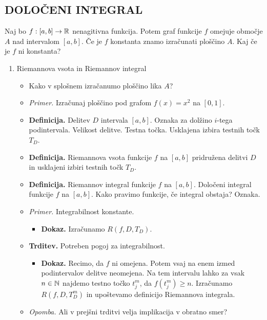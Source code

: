 \subsection{DOLOČENI INTEGRAL}
Naj bo $f: [a, b] \to \mathbb{R}$ nenagitivna funkcija. Potem graf funkcije $f$ omejuje območje $A$ nad intervalom $[a, b]$. Če je $f$ konstanta znamo izračunati ploščino $A$. Kaj če je $f$ ni konstanta?
\begin{enumerate}
        \item Riemannova vsota in Riemannov integral
    \begin{itemize}   
        \item Kako v splošnem izračanumo ploščino lika $A$?     
        \item \colorbox{yellow!30}{\emph{Primer.}} Izračunaj ploščino pod grafom $f(x) = x^2$ na $[0,1]$.
        \item \colorbox{purple!30}{\textbf{Definicija.}} Delitev $D$ intervala $[a,b]$. Oznaka za dolžino $i$-tega podintervala. Velikost delitve. Testna točka. Usklajena izbira testnih točk $T_D$. 
        \item \colorbox{purple!30}{\textbf{Definicija.}} Riemannova vsota funkcije $f$ na $[a,b]$ pridružena delitvi $D$ in usklajeni izbiri testnih točk $T_D$.
        \item \colorbox{purple!30}{\textbf{Definicija.}} Riemannov integral funkcije $f$ na $[a,b]$. Določeni integral funkcije $f$ na $[a, b]$. Kako pravimo funkcije, če integral obstaja? Oznaka. 
        \item \colorbox{yellow!30}{\emph{Primer.}} Integrabilnost konstante.
        \begin{itemize}
            \item \colorbox{green!30}{\textbf{Dokaz.}} Izračunamo $R(f, D, T_D)$.
        \end{itemize}
        \item \colorbox{blue!30}{\textbf{Trditev.}} Potreben pogoj za integrabilnost.
        \begin{itemize}
            \item \colorbox{green!30}{\textbf{Dokaz.}} Recimo, da $f$ ni omejena. Potem vsaj na enem izmed podintervalov delitve neomejena. Na tem intervalu lahko za vsak $n \in \mathbb{N}$ najdemo testno točko $t_j^m$, da $f(t_j^m) \geq n$. Izračunamo $R(f, D, T_D^m)$ in upoštevamo definicijo Riemannova integrala.
        \end{itemize}
        \item \colorbox{yellow!30}{\emph{Opomba.}} Ali v prejšni trditvi velja implikacija v obratno smer?

\end{itemize}
\end{enumerate}
